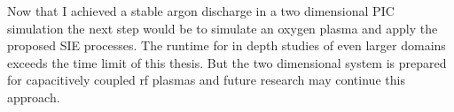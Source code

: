 

Now that I achieved a stable argon discharge in a two dimensional PIC simulation the next step would be to simulate an oxygen plasma and apply the proposed SIE processes.
The runtime for in depth studies of even larger domains exceeds the time limit of this thesis.
But the two dimensional system is prepared for capacitively coupled rf plasmas and future research may continue this approach. \\
